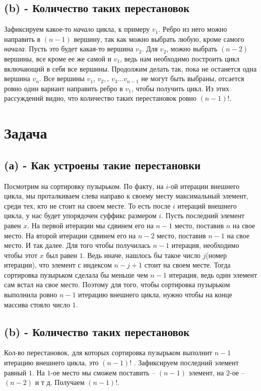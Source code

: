 \documentclass{article}
\begin{document}
\subsection*{(b) - Количество таких перестановок}
Зафиксируем какое-то \textit{начало} цикла, к примеру $v_{1}$. Ребро из него можно направить в $(n - 1)$ вершину, так как можно выбрать любую, кроме самого \textit{начала}. Пусть это будет какая-то вершина $v_{2}$.
\newline
Для $v_{2}$, можно выбрать $(n - 2)$ вершины, все кроме ее же самой и $v_{1}$, ведь нам необходимо построить цикл включающий в себя все вершины. 
\newline
Продолжим делать так, пока не останется одна вершина $v_{n}$. Все вершины $v_{1} \mbox{, } v_{2}, \mbox{, } v_{3} \dots v_{n - 1}$  не могут быть выбраны, отсается ровно один вариант направить ребро в $v_{1}$, чтобы получить цикл. 
\newline
Из этих рассуждений видно, что количество таких перестановок ровно $(n - 1)!$.
\section*{Задача }
\subsection*{(а) - Как устроены такие перестановки}
Посмотрим на сортировку пузырьком. По факту, на $i$-ой итерации внешнего цикла, мы проталкиваем слева направо к своему месту максимальный элемент, среди тех, кто не стоит на своем месте. То есть после $i$ итераций внешнего цикла, у нас будет упорядочен суффикс размером $i$. 
\newline
Пусть последний элемент равен $x$. На первой итерации мы сдвинем его на $n - 1$ место, поставив $n$ на свое место. На второй итерации сдвинем его на $n - 2$ место, поставив $n - 1$ на свое место. И так далее. 
\newline
Для того чтобы получилась $n - 1$ итерация, необходимо чтобы этот $x$ был равен $1$. Ведь иначе, нашлось бы такое число $j$(номер итерации), что элемент с индексом $n - j + 1$ стоит на своем месте. Тогда сортировка пузырьком сделала бы меньше чем $n - 1$ итерация, ведь один элемент сам встал на свое место.
\newline
Поэтому для того, чтобы сортировка пузырьком выполнила ровно $n - 1$ итерацию внешнего цикла, нужно чтобы на конце массива стояло число $1$. 
\subsection*{(b) - Количество таких перестановок}
Кол-во перестановок, для которых сортировка пузырьком выполнит $n - 1$ итерацию внешнего цикла, это $(n - 1)!$  .   Зафиксируем последний элемент равный $1$. На $1$-ое место мы сможем поставить -- $(n - 1)$ элемент, на $2$-ое -- $(n - 2)$ и т д. Получаем $(n - 1)!$.
\end{document}
